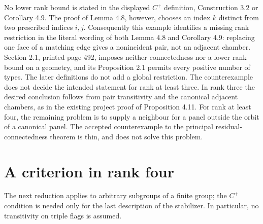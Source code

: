 \documentclass[11pt]{article}
\begin{document}
No lower rank bound is stated in the displayed $C^+$ definition,
Construction 3.2 or Corollary 4.9. The proof of Lemma 4.8, however,
chooses an index $k$ distinct from two prescribed indices $i,j$.
Consequently this example identifies a missing rank restriction in the
literal wording of both Lemma 4.8 and Corollary 4.9: replacing one face
of a matching edge gives a nonincident pair, not an adjacent chamber.
Section 2.1, printed page 492, imposes neither connectedness nor a lower
rank bound on a geometry, and its Proposition 2.1 permits every positive
number of types. The later definitions do not add a global restriction.
The counterexample does not decide the intended statement for rank at
least three. In rank three the desired conclusion follows from pair
transitivity and the canonical adjacent chambers, as in the existing
project proof of Proposition 4.11. For rank at least four, the remaining
problem is to supply a neighbour for a panel outside the orbit of a
canonical panel. The accepted counterexample to the principal
residual-connectedness theorem is thin, and does not solve this problem.

\section{A criterion in rank four}
The next reduction applies to arbitrary subgroups of a finite group;
the $C^+$ condition is needed only for the last description of the
stabilizer. In particular, no transitivity on triple flags is assumed.
\end{document}
